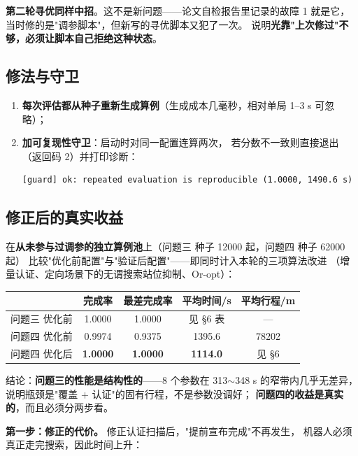 \textbf{第二轮寻优同样中招}。这不是新问题——论文自检报告里记录的故障 1 就是它，
当时修的是"调参脚本"，但新写的寻优脚本又犯了一次。
说明\textbf{光靠"上次修过"不够，必须让脚本自己拒绝这种状态}。

\subsection{修法与守卫}

\begin{enumerate}[leftmargin=1.8em]
  \item \textbf{每次评估都从种子重新生成算例}（生成成本几毫秒，相对单局 1--3 s 可忽略）；
  \item \textbf{加可复现性守卫}：启动时对同一配置连算两次，
        若分数不一致则直接退出（返回码 2）并打印诊断：
\begin{lstlisting}[caption={守卫的输出}]
[guard] ok: repeated evaluation is reproducible (1.0000, 1490.6 s)
\end{lstlisting}
\end{enumerate}

\subsection{修正后的真实收益}

在\textbf{从未参与过调参的独立算例池}上（问题三 种子 12000 起，问题四 种子 62000 起）
比较"优化前配置"与"验证后配置"——即同时计入本轮的三项算法改进
（增量认证、定向场景下的无谓搜索站位抑制、Or-opt）：

\begin{center}
\begin{tabular}{lcccc}
\toprule
 & 完成率 & 最差完成率 & 平均时间/s & 平均行程/m \\ \midrule
问题三 优化前 & 1.0000 & 1.0000 & 见 \S 6 表 & --- \\
问题四 优化前 & 0.9974 & 0.9375 & 1395.6 & 78202 \\
问题四 优化后 & \textbf{1.0000} & \textbf{1.0000} & \textbf{1114.0} & 见 \S 6 \\
\bottomrule
\end{tabular}
\end{center}

结论：\textbf{问题三的性能是结构性的}——8 个参数在 313$\sim$348 s 的窄带内几乎无差异，
说明瓶颈是"覆盖 $+$ 认证"的固有行程，不是参数没调好；
\textbf{问题四的收益是真实的}，而且必须分两步看。

\textbf{第一步：修正的代价。} 修正认证扫描后，"提前宣布完成"不再发生，
机器人必须真正走完搜索，因此时间上升：


